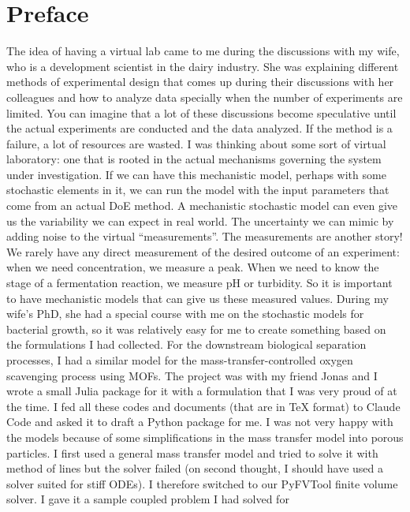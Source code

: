 \chapter*{Preface}

The idea of having a virtual lab came to me during the discussions with my wife,
who is a development scientist in the dairy industry. She was explaining different
methods of experimental design that comes up during their discussions with her
colleagues and how to analyze data specially when the number of experiments are
limited. You can imagine that a lot of these discussions become speculative until
the actual experiments are conducted and the data analyzed. If the method is a
failure, a lot of resources are wasted. I was thinking about some sort of virtual
laboratory: one that is rooted in the actual mechanisms governing the system under
investigation. If we can have this mechanistic model, perhaps with some stochastic
elements in it, we can run the model with the input parameters that come from an
actual DoE method. A mechanistic stochastic model can even give us the variability
we can expect in real world. The uncertainty we can mimic by adding noise to the
virtual ``measurements''. The measurements are another story! We rarely have any
direct measurement of the desired outcome of an experiment: when we need
concentration, we measure a peak. When we need to know the stage of a fermentation
reaction, we measure pH or turbidity. So it is important to have mechanistic models
that can give us these measured values. During my wife's PhD, she had a special
course with me on the stochastic models for bacterial growth, so it was relatively
easy for me to create something based on the formulations I had collected. For the
downstream biological separation processes, I had a similar model for the
mass-transfer-controlled oxygen scavenging process using MOFs. The project was with
my friend Jonas and I wrote a small Julia package for it with a formulation that I
was very proud of at the time. I fed all these codes and documents (that are in
\TeX{} format) to Claude Code and asked it to draft a Python package for me. I was
not very happy with the models because of some simplifications in the mass transfer
model into porous particles. I first used a general mass transfer model and tried
to solve it with method of lines but the solver failed (on second thought, I should
have used a solver suited for stiff ODEs). I therefore switched to our PyFVTool
finite volume solver. I gave it a sample coupled problem I had solved for
